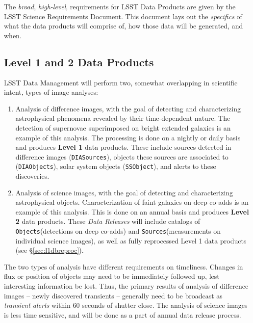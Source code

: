 \documentclass[12pt]{article}
\newcommand{\code}[1]{\texttt{#1}}
\newcommand{\DIASources}{\code{DIASources}\xspace}
\newcommand{\DIAObjects}{\code{DIAObjects}\xspace}
\newcommand{\Objects}{\code{Objects}\xspace}
\newcommand{\Sources}{\code{Sources}\xspace}
\newcommand{\SSObject}{\code{SSObject}\xspace}
\begin{document}
The {\em broad}, {\em high-level}, requirements for LSST Data Products are given by the LSST Science Requirements Document. This document lays out the {\em specifics} of what the data products will comprise of, how those data will be generated, and when.

\subsection{Level 1 and 2 Data Products}

LSST Data Management will perform two, somewhat overlapping in scientific intent, types of image analyses:

\begin{enumerate}
\item Analysis of difference images, with the goal of detecting and characterizing astrophysical phenomena revealed by their time-dependent nature. The detection of supernovae superimposed on bright extended galaxies is an example of this analysis. The processing is done on a nightly or daily basis and produces {\bf Level 1} data products. These include sources detected in difference images (\DIASources), objects these sources are associated to (\DIAObjects), solar system objects (\SSObject), and alerts to these discoveries.
\item Analysis of science images, with the goal of detecting and characterizing astrophysical objects. Characterization of faint galaxies on deep co-adds is an example of this analysis. This is done on an annual basis and produces {\bf Level 2} data products. These {\em Data Releases} will include catalogs of \Objects (detections on deep co-adds) and \Sources (measurements on individual science images), as well as fully reprocessed Level 1 data products (see \S \ref{sec:l1dbreproc}).
\end{enumerate}
 
The two types of analysis have different requirements on timeliness. Changes in flux or position of objects may need to be immediately followed up, lest interesting information be lost. Thus, the primary results of analysis of difference images -- newly discovered transients -- generally need to be broadcast as {\em transient alerts} within 60 seconds of shutter close. The analysis of science images is less time sensitive, and will be done as a part of annual data release process.


\end{document}

